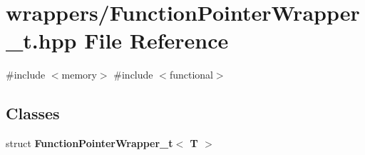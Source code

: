 \section{wrappers/\+Function\+Pointer\+Wrapper\+\_\+t.hpp File Reference}
\label{_function_pointer_wrapper__t_8hpp}
{\ttfamily \#include $<$memory$>$}\newline
{\ttfamily \#include $<$functional$>$}\newline
\subsection*{Classes}
\begin{DoxyCompactItemize}
\item 
struct \textbf{ Function\+Pointer\+Wrapper\+\_\+t$<$ T $>$}
\end{DoxyCompactItemize}

